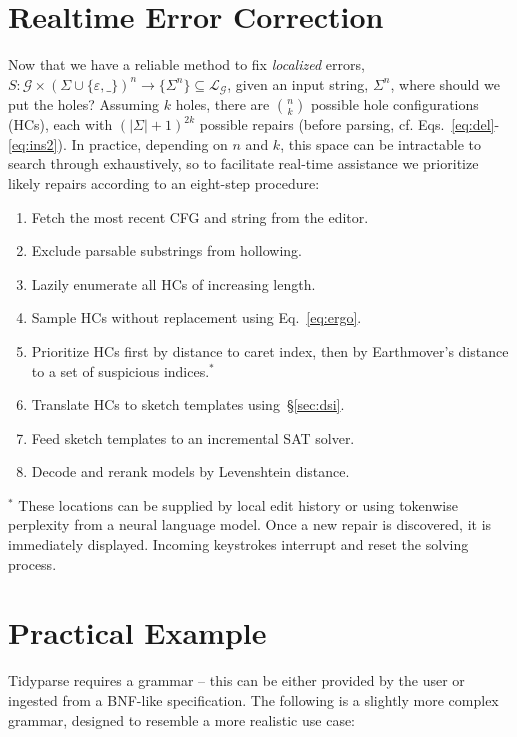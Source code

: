 \documentclass[sigplan,review,anonymous,acmsmall]{acmart}\settopmatter{printfolios=false,printccs=false,printacmref=false}
\begin{document}
\section{Realtime Error Correction}\label{sec:holes}

Now that we have a reliable method to fix \textit{localized} errors, $S: \mathcal{G} \times (\Sigma\cup\{\varepsilon, \texttt{\_}\})^n \rightarrow \{\Sigma^n\}\subseteq \mathcal{L}_\mathcal{G}$, given an input string, $\Sigma^n$, where should we put the holes? Assuming $k$ holes, there are ${n \choose k}$ possible hole configurations (HCs), each with $(|\Sigma| + 1)^{2k}$ possible repairs (before parsing, cf. Eqs.~\ref{eq:del}-\ref{eq:ins2}). In practice, depending on $n$ and $k$, this space can be intractable to search through exhaustively, so to facilitate real-time assistance we prioritize likely repairs according to an eight-step procedure:

\begin{enumerate}
    \item Fetch the most recent CFG and string from the editor.
    \item Exclude parsable substrings from hollowing.
    \item Lazily enumerate all HCs of increasing length.
    \item Sample HCs without replacement using Eq.~\ref{eq:ergo}.
    \item Prioritize HCs first by distance to caret index, then by Earthmover's distance to a set of suspicious indices.$^*$
    \item Translate HCs to sketch templates using~\S\ref{sec:dsi}.
    \item Feed sketch templates to an incremental SAT solver.
    \item Decode and rerank models by Levenshtein distance.
\end{enumerate}

\noindent $^*$ These locations can be supplied by local edit history or using tokenwise perplexity from a neural language model. Once a new repair is discovered, it is immediately displayed. Incoming keystrokes interrupt and reset the solving process.


\section{Practical Example}

Tidyparse requires a grammar -- this can be either provided by the user or ingested from a BNF-like specification. The following is a slightly more complex grammar, designed to resemble a more realistic use case:
\end{document}

